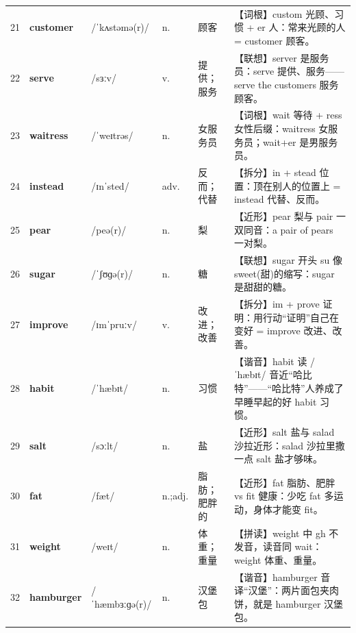 \documentclass[UTF8,a4paper,11pt,oneside]{ctexbook}
\newcommand{\cellword}[1]{{\bfseries\textcolor{wordcol}{#1}}}
\newcommand{\cellipa}[1]{{\footnotesize\textcolor{ipacol}{#1}}}
\newcommand{\cellpos}[1]{\textcolor{poscol}{#1}}
\newcommand{\cellno}[1]{\textcolor{volcolor!75!black}{#1}}
\begin{document}
{\begin{longtable}{@{}C{0.045\textwidth}L{0.155\textwidth}L{0.175\textwidth}C{0.070\textwidth}L{0.180\textwidth}L{0.282\textwidth}@{}}
 \cellno{21} & \cellword{customer} & \cellipa{/ˈkʌstəmə(r)/} & \cellpos{n.} & 顾客 & \textcolor{tagRoot}{【词根】}custom 光顾、习惯 + er 人：常来光顾的人 = customer 顾客。 \\
\cellno{22} & \cellword{serve} & \cellipa{/sɜːv/} & \cellpos{v.} & 提供；服务 & \textcolor{tagAssoc}{【联想】}server 是服务员：serve 提供、服务——serve the customers 服务顾客。 \\
 \cellno{23} & \cellword{waitress} & \cellipa{/ˈweɪtrəs/} & \cellpos{n.} & 女服务员 & \textcolor{tagRoot}{【词根】}wait 等待 + ress 女性后缀：waitress 女服务员；wait+er 是男服务员。 \\
\cellno{24} & \cellword{instead} & \cellipa{/ɪnˈsted/} & \cellpos{adv.} & 反而；代替 & \textcolor{tagSplit}{【拆分】}in + stead 位置：顶在别人的位置上 = instead 代替、反而。 \\
 \cellno{25} & \cellword{pear} & \cellipa{/peə(r)/} & \cellpos{n.} & 梨 & \textcolor{tagNear}{【近形】}pear 梨与 pair 一双同音：a pair of pears 一对梨。 \\
\cellno{26} & \cellword{sugar} & \cellipa{/ˈʃʊɡə(r)/} & \cellpos{n.} & 糖 & \textcolor{tagAssoc}{【联想】}sugar 开头 su 像 sweet(甜)的缩写：sugar 是甜甜的糖。 \\
 \cellno{27} & \cellword{improve} & \cellipa{/ɪmˈpruːv/} & \cellpos{v.} & 改进；改善 & \textcolor{tagSplit}{【拆分】}im + prove 证明：用行动“证明”自己在变好 = improve 改进、改善。 \\
\cellno{28} & \cellword{habit} & \cellipa{/ˈhæbɪt/} & \cellpos{n.} & 习惯 & \textcolor{tagSound}{【谐音】}habit 读 /ˈhæbɪt/ 音近“哈比特”——“哈比特”人养成了早睡早起的好 habit 习惯。 \\
 \cellno{29} & \cellword{salt} & \cellipa{/sɔːlt/} & \cellpos{n.} & 盐 & \textcolor{tagNear}{【近形】}salt 盐与 salad 沙拉近形：salad 沙拉里撒一点 salt 盐才够味。 \\
\cellno{30} & \cellword{fat} & \cellipa{/fæt/} & \cellpos{n.;\allowbreak{}adj.} & 脂肪；肥胖的 & \textcolor{tagNear}{【近形】}fat 脂肪、肥胖 vs fit 健康：少吃 fat 多运动，身体才能变 fit。 \\
 \cellno{31} & \cellword{weight} & \cellipa{/weɪt/} & \cellpos{n.} & 体重；重量 & \textcolor{tagSpell}{【拼读】}weight 中 gh 不发音，读音同 wait：weight 体重、重量。 \\
\cellno{32} & \cellword{hamburger} & \cellipa{/ˈhæmbɜːɡə(r)/} & \cellpos{n.} & 汉堡包 & \textcolor{tagSound}{【谐音】}hamburger 音译“汉堡”：两片面包夹肉饼，就是 hamburger 汉堡包。 \\

\end{longtable}}
\end{document}
